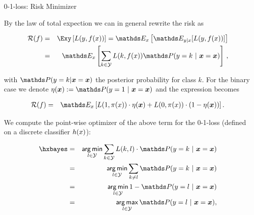 \begin{vbframe}{0-1-loss: Risk Minimizer}

By the law of total expection we can in general rewrite the risk as

\vspace*{-0.5cm}

\begin{eqnarray*}
  \riskf  & = & \Exy\left[\Lxy\right] = \E_x \left[ \E_{y|x} [ L(y, \fx) ] \right] \\
          & = & \E_x \left[\sum_{k \in \Yspace} L(k, \fx) \P(y = k~|~ \xv = \xv)\right]\,, 
\end{eqnarray*}

with $\P(y = k| \xv = \xv)$ the posterior probability for class $k$. For the binary case we denote $\eta(\xv) := \P(y = 1 ~|~ \xv = \xv)$ and the expression becomes 

\vspace*{-0.3cm}


\begin{eqnarray*}
  \riskf &=& \E_x \left[L(1, \pix) \cdot \eta(\xv) + L(0, \pix) \cdot (1 - \eta(\xv)) \right]. 
\end{eqnarray*}







\framebreak 

We compute the point-wise optimizer of the above term for the 0-1-loss (defined on a discrete classifier $h(x)$): 

  \begin{eqnarray*}  
  \hxbayes &=& \argmin_{l \in \Yspace} \sum_{k \in \Yspace} L(k, l) \cdot \P(y = k~|~\xv = \xv) \\
  &=& \argmin_{l \in \Yspace} \sum_{k \ne l} \P(y = k~|~\xv = \xv) \\ 
  &=& \argmin_{l \in \Yspace} 1 - \P(y = l~|~\xv = \xv) \\
  &=& \argmax_{l \in \Yspace} \P(y = l~|~ \xv = \xv),
  \end{eqnarray*}


\end{vbframe}
